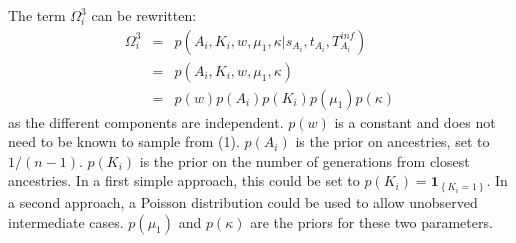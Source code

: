 \documentclass[10pt]{article}
\begin{document}
The term $\Omega_i^3$ can be rewritten:
\begin{eqnarray}
\Omega_i^3 &=&  p(A_i, K_i, w, \mu_1, \kappa | s_{A_i}, t_{A_i}, T_{A_i}^{inf})\\
&=&  p(A_i, K_i, w, \mu_1, \kappa)\\
      & = &   p(w) p(A_i) p(K_i)  p(\mu_1) p(\kappa)
\end{eqnarray}
as the different components are independent.
$p(w)$ is a constant and does not need to be known to sample from (1).
$p(A_i)$ is the prior on ancestries, set to $1/(n-1)$.
$p(K_i)$ is the prior on the number of generations from closest ancestries. In a first simple approach, this could be set to $p(K_i) = \mathbf{1}_{\left\lbrace K_i=1\right\rbrace}$.
In a second approach, a Poisson distribution could be used to allow unobserved intermediate cases.
$ p(\mu_1)$ and $p(\kappa)$ are the priors for these two parameters.
~\\
\end{document}

